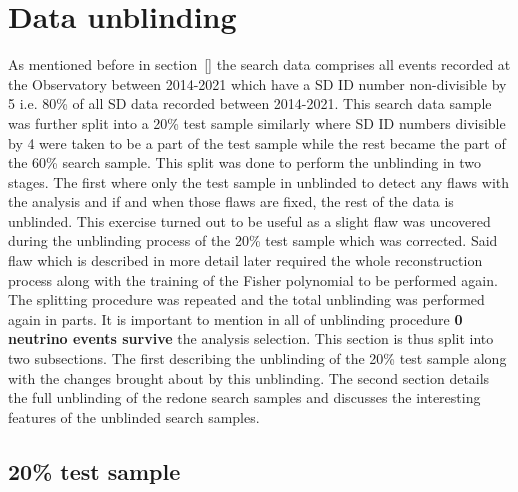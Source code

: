 \section{Data unblinding}
\label{sec:data_unblinding}
As mentioned before in section~\ref{} the search data comprises all events recorded at the Observatory between 2014-2021 which have a SD ID number non-divisible by 5 i.e. 80\% of all SD data recorded between 2014-2021. This search data sample was further split into a 20\% test sample similarly where SD ID numbers divisible by 4 were taken to be a part of the test sample while the rest became the part of the 60\% search sample. This split was done to perform the unblinding in two stages. The first where only the test sample in unblinded to detect any flaws with the analysis and if and when those flaws are fixed, the rest of the data is unblinded. This exercise turned out to be useful as a slight flaw was uncovered during the unblinding process of the 20\% test sample which was corrected. Said flaw which is described in more detail later required the whole reconstruction process along with the training of the Fisher polynomial to be performed again. The splitting procedure was repeated and the total unblinding was performed again in parts. It is important to mention in all of unblinding procedure \textbf{0 neutrino events survive} the analysis selection.
This section is thus split into two subsections. The first describing the unblinding of the 20\% test sample along with the changes brought about by this unblinding. The second section details the full unblinding of the redone search samples and discusses the interesting features of the unblinded search samples. 

\subsection{20\% test sample}
\label{subsec:unblind_20}

